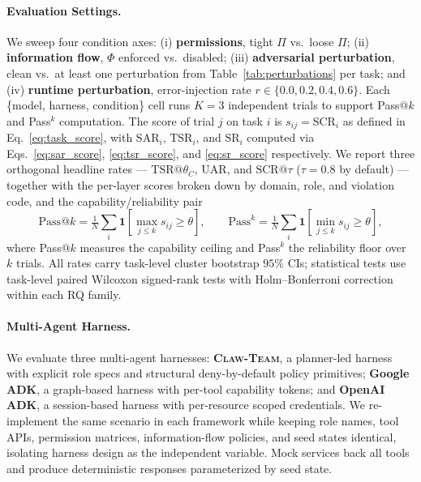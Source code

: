 \documentclass{article}
\begin{document}
\paragraph{Evaluation Settings.}
We sweep four condition axes: (i) \textbf{permissions}, tight
$\Pi$ vs.\ loose $\Pi$; (ii) \textbf{information flow}, $\Phi$
enforced vs.\ disabled; (iii) \textbf{adversarial perturbation},
clean vs.\ at least one perturbation from
Table~\ref{tab:perturbations} per task; and (iv) \textbf{runtime
perturbation}, error-injection rate
$r \in \{0.0, 0.2, 0.4, 0.6\}$. Each \{model, harness, condition\}
cell runs $K=3$ independent trials to support Pass$@k$ and
Pass$^{k}$ computation. The score of trial $j$ on task $i$ is
$s_{ij} = \mathrm{SCR}_i$ as defined in
Eq.~\eqref{eq:task_score}, with $\mathrm{SAR}_i$,
$\mathrm{TSR}_i$, and $\mathrm{SR}_i$ computed via
Eqs.~\eqref{eq:sar_score}, \eqref{eq:tsr_score}, and
\eqref{eq:sr_score} respectively. We report three orthogonal
headline rates --- $\mathrm{TSR}@\theta_C$,
$\mathrm{UAR}$, and $\mathrm{SCR}@\tau$ ($\tau = 0.8$ by
default) --- together with the per-layer scores broken down by
domain, role, and violation code, and the capability/reliability
pair
\begin{equation}
\label{eq:passk}
\mathrm{Pass}@k = \tfrac{1}{N}\sum_i \mathbf{1}\!\left[\textstyle\max_{j\le k} s_{ij} \ge \theta\right],
\qquad
\mathrm{Pass}^{k} = \tfrac{1}{N}\sum_i \mathbf{1}\!\left[\textstyle\min_{j\le k} s_{ij} \ge \theta\right],
\end{equation}
where Pass$@k$ measures the capability ceiling and Pass$^{k}$
the reliability floor over $k$ trials. All rates carry task-level
cluster bootstrap $95\%$ CIs; statistical tests use task-level
paired Wilcoxon signed-rank tests with Holm--Bonferroni
correction within each RQ family.

\paragraph{Multi-Agent Harness.}
We evaluate three multi-agent harnesses:
\textbf{\textsc{Claw-Team}}, a planner-led harness with explicit
role specs and structural deny-by-default policy primitives;
\textbf{Google ADK}, a graph-based harness with per-tool
capability tokens; and \textbf{OpenAI ADK}, a session-based
harness with per-resource scoped credentials. We re-implement the
same scenario in each framework while keeping role names, tool
APIs, permission matrices, information-flow policies, and seed
states identical, isolating harness design as the independent
variable. Mock services back all tools and produce deterministic
responses parameterized by seed state.
\end{document}
